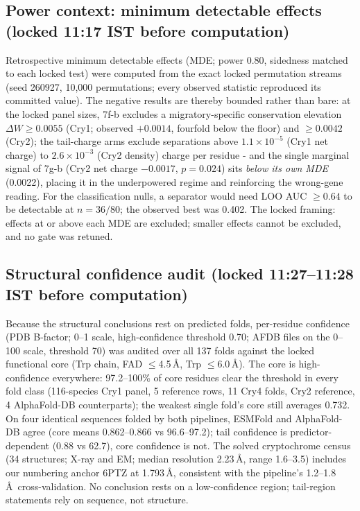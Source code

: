 \documentclass[12pt,a4paper]{article}
\begin{document}
\subsection{Power context: minimum detectable effects (locked 11:17 IST before computation)}
Retrospective minimum detectable effects (MDE; power 0.80, sidedness matched to each locked test) were computed from the exact locked permutation streams (seed 260927, 10{,}000 permutations; every observed statistic reproduced its committed value). The negative results are thereby bounded rather than bare: at the locked panel sizes, 7f-b excludes a migratory-specific conservation elevation $\Delta W \geq 0.0055$ (Cry1; observed $+0.0014$, fourfold below the floor) and $\geq 0.0042$ (Cry2); the tail-charge arms exclude separations above $1.1\times10^{-5}$ (Cry1 net charge) to $2.6\times10^{-3}$ (Cry2 density) charge per residue - and the single marginal signal of 7g-b (Cry2 net charge $-0.0017$, $p=0.024$) sits \emph{below its own MDE} (0.0022), placing it in the underpowered regime and reinforcing the wrong-gene reading. For the classification nulls, a separator would need LOO AUC $\geq 0.64$ to be detectable at $n=36/80$; the observed best was 0.402. The locked framing: effects at or above each MDE are excluded; smaller effects cannot be excluded, and no gate was retuned.

\subsection{Structural confidence audit (locked 11:27--11:28 IST before computation)}
Because the structural conclusions rest on predicted folds, per-residue confidence (PDB B-factor; 0--1 scale, high-confidence threshold 0.70; AFDB files on the 0--100 scale, threshold 70) was audited over all 137 folds against the locked functional core (Trp chain, FAD $\leq$4.5\,\AA, Trp $\leq$6.0\,\AA). The core is high-confidence everywhere: 97.2--100\% of core residues clear the threshold in every fold class (116-species Cry1 panel, 5 reference rows, 11 Cry4 folds, Cry2 reference, 4 AlphaFold-DB counterparts); the weakest single fold's core still averages 0.732. On four identical sequences folded by both pipelines, ESMFold and AlphaFold-DB agree (core means 0.862--0.866 vs 96.6--97.2); tail confidence is predictor-dependent (0.88 vs 62.7), core confidence is not. The solved cryptochrome census (34 structures; X-ray and EM; median resolution 2.23\,\AA, range 1.6--3.5) includes our numbering anchor 6PTZ at 1.793\,\AA, consistent with the pipeline's 1.2--1.8\,\AA\ cross-validation. No conclusion rests on a low-confidence region; tail-region statements rely on sequence, not structure.
\end{document}
